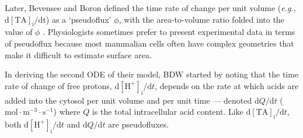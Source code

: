 \documentclass[fleqn,10pt]{physiome}
\begin{document}
Later, Bevensee and Boron defined the time rate of change per unit volume (\emph{e.g.}, $\mathrm{d[TA]_i/dt}$) as a `pseudoflux' $\phi$, with the area-to-volume ratio folded into the value of $\phi$ \citep{bevensee2013control}. Physiologists sometimes prefer to present experimental data in terms of pseudoflux because most mammalian cells often have complex geometries that make it difficult to estimate surface area.

In deriving the second ODE of their model, BDW started by noting that the time rate of change of free protons, $\mathrm{d[H^+]_i}/\mathrm{d}t$, depends on the rate at which acids are added into the cytosol per unit volume and per unit time --- denoted $\mathrm{d}Q/\mathrm{d}t$ ($\mathrm{mol\cdot m^{-3}\cdot s^{-1}}$) where $Q$ is the total intracellular acid content. Like $\mathrm{d[TA]_i}/\mathrm{d}t$, both $\mathrm{d[H^+]_i}/\mathrm{d}t$ and $\mathrm{d}Q/\mathrm{d}t$ are pseudofluxes.
\end{document}
